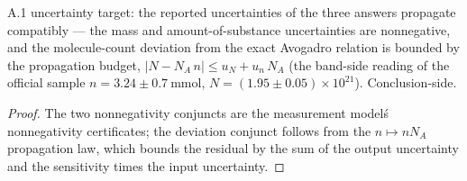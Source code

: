 \begin{theorem}
\label{thm:IPhO2026Problems_problem_IPhO_2026_4_A_1:uncertainty_consistency}
A.1 uncertainty target: the reported uncertainties of the three
answers propagate compatibly --- the mass and amount-of-substance
uncertainties are nonnegative, and the molecule-count deviation from
the exact Avogadro relation is bounded by the propagation budget,
$|N - N_A\, n| \le u_N + u_n\, N_A$ (the band-side reading of the
official sample $n = 3.24 \pm 0.7\ \mathrm{mmol}$,
$N = (1.95 \pm 0.05) \times 10^{21}$).  Conclusion-side.
\end{theorem}
\begin{proof}
The two nonnegativity conjuncts are the measurement model\'s
nonnegativity certificates; the deviation conjunct follows from the
$n \mapsto n N_A$ propagation law, which bounds the residual by the
sum of the output uncertainty and the sensitivity times the input
uncertainty.
\end{proof}
